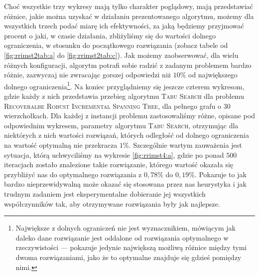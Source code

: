 Choć wszystkie trzy wykresy mają tylko charakter poglądowy, mają przedstawiać różnice, jakie można uzyskać w działaniu prezentowanego algorytmu, możemy dla wszystkich trzech podać miarę ich efektywności, za jaką będziemy przyjmować procent o jaki, w czasie działania, zbliżyliśmy się do wartości dolnego ograniczenia, w stosunku do początkowego rozwiązania (zobacz tabele od \ref{fig:rrimst2tab:a} do \ref{fig:rrimst2tab:c}). Jak możemy zaobserwować, dla wielu różnych konfiguracji, algorytm potrafi sobie radzić z zadanym problemem bardzo różnie, zazwyczaj nie zwracając gorszej odpowiedzi niż $10\%$ od największego dolnego ograniczenia\footnote{Największe z dolnych ograniczeń nie jest wyznacznikiem, mówiącym jak daleko dane rozwiązanie jest oddalone od rozwiązania optymalnego w rzeczywistości --- pokazuje jedynie największą możliwą różnice między tymi dwoma rozwiązaniami, jako że to optymalne znajduje się gdzieś pomiędzy nimi.}. Na koniec przyglądniemy się jeszcze czterem wykresom, gdzie każdy z nich przedstawia przebieg algorytmu \textsc{Tabu Search} dla problemu \textsc{Recoveralbe Robust Incremental Spanning Tree}, dla pełnego grafu o $30$ wierzchołkach. Dla każdej z instancji problemu zastosowaliśmy różne, opisane pod odpowiednim wykresem, parametry algorytmu \textsc{Tabu Search}, otrzymując dla niektórych z nich wartości rozwiązań, których odległość od dolnego ograniczenia na wartość optymalną nie przekracza $1\%$. Szczególnie wartym zauważenia jest sytuacja, którą uchwyciliśmy na wykresie \ref{fig:rrimst4:a}, gdzie po ponad $500$ iteracjach zostało znalezione takie rozwiązanie, którego wartość okazała się przybliżyć nas do optymalnego rozwiązania z $0,78\%$ do $0,19\%$. Pokazuje to jak bardzo nieprzewidywalną może okazać się stosowana przez nas heurystyka i jak trudnym zadaniem jest eksperymentalne dobieranie jej wszystkich współczynników tak, aby otrzymywane rozwiązania były jak najlepsze.

